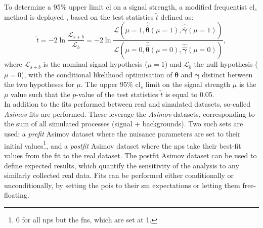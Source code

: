 To determine a 95\% upper limit \gls{cl} on a signal strength, a modified frequentist \gls{cl}$_s$ method is deployed \cite{asympForm, ALRead_2002}, based on the test statistics $\tilde{t}$ defined as:
\begin{equation}
    \tilde{t} = -2 \ln \frac{\mathcal{L}_{s+b}}{\mathcal{L}_{b}} = -2 \ln \frac{\mathcal{L}\left(\mu = 1, \hat{\hat{\boldsymbol{\theta}}}(\mu = 1), \hat{\hat{\boldsymbol{\gamma}}}(\mu = 1) \right)}{\mathcal{L}\left(\mu = 0, \hat{\hat{\boldsymbol{\theta}}}(\mu = 0), \hat{\hat{\boldsymbol{\gamma}}}(\mu = 0) \right)},
\end{equation}
where $\mathcal{L}_{s+b}$ is the nominal signal hypothesis ($\mu = 1$) and $\mathcal{L}_{b}$ the null hypothesis ($\mu = 0$), with the conditional likelihood optimisation of $\boldsymbol{\theta}$ and $\boldsymbol{\gamma}$ distinct between the two hypotheses for $\mu$. The upper 95\% \gls{cl}$_s$ limit on the signal strength $\mu$ is the $\mu$ value such that the $p$-value of the test statistics $\tilde{t}$ is equal to 0.05.\\

In addition to the fits performed between real and simulated datasets, so-called \textit{Asimov} fits are performed. These leverage the \textit{Asimov} datasets, corresponding to the sum of all simulated processes (signal + backgrounds). Two such sets are used: a \textit{prefit} Asimov dataset where the nuisance parameters are set to their initial values\footnote{0 for all \gls{np}s but the \gls{fn}s, which are set at 1.}, and a \textit{postfit} Asimov dataset where the \gls{np}s take their best-fit values from the fit to the real dataset. The postfit Asimov dataset can be used to define expected results, which quantify the sensitivity of the analysis to any similarly collected real data. Fits can be performed either conditionally or unconditionally, by setting the \gls{poi}s to their \gls{sm} expectations or letting them free-floating. 

